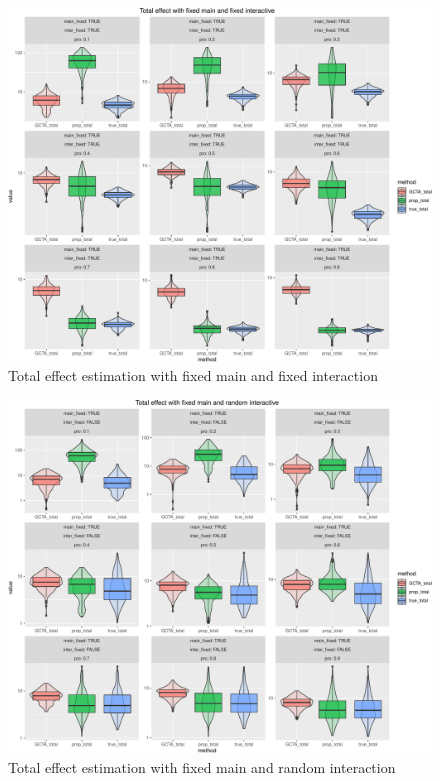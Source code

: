 \documentclass[]{article}
\begin{document}
\begin{figure}
\centering
\includegraphics{Simulation_report_files/figure-latex/Total effect fixed fixed-1.pdf}
\caption{Total effect estimation with fixed main and fixed interaction}
\end{figure}

\begin{figure}
\centering
\includegraphics{Simulation_report_files/figure-latex/Total effect fixed random-1.pdf}
\caption{Total effect estimation with fixed main and random interaction}
\end{figure}
\end{document}
